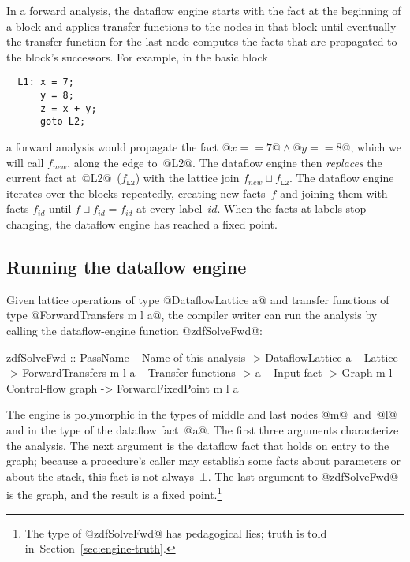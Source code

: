 \documentclass[blockstyle,preprint,natbib,nocopyrightspace]{sigplanconf}
\newcommand\join{\sqcup}
\newcommand{\authornote}[1]{{\em #1}}
\def\authornote#1{\unskip\relax}
\newcommand{\norman}[1]{\authornote{NR: #1}}
\let\remark\norman
\newcommand\secref[1]{Section~\ref{sec:#1}}
\newcommand\seclabel[1]{\label{sec:#1}}
\begin{document}
In a forward analysis, the dataflow engine starts with the fact at the
beginning of a block and applies transfer functions to the nodes in
that block until eventually the transfer function for the last node
computes the facts that are propagated to the block's successors.
For example, in the basic block
\begin{verbatim}
  L1: x = 7;
      y = 8;
      z = x + y;
      goto L2;
\end{verbatim}
a forward analysis would propagate the fact 
$@x == 7@ \land @y == 8@$, which we will call $f_{\mathit{new}}$,
along the edge to~@L2@. 
The dataflow engine then \emph{replaces} the current fact
at~@L2@~($f_{\mathtt{L2}}$) with the lattice join $f_{\mathit{new}}
\join f_{\mathtt{L2}}$. 
The dataflow engine iterates over the blocks repeatedly, creating new
facts~$f$ and joining them with facts $f_{\mathit{id}}$ until
\mbox{$f \join f_{\mathit{id}} = f_{\mathit{id}}$} at every label~$\mathit{id}$.
When the facts at labels stop changing, the dataflow
engine has reached a fixed point.



\subsection{Running the dataflow engine}

\seclabel{zdfSolveFwd}

Given lattice operations of type @DataflowLattice a@
and transfer functions of type @ForwardTransfers m l a@,
the compiler writer can run the analysis by calling the
dataflow-engine function @zdfSolveFwd@:
\begin{code}
 zdfSolveFwd 
  :: PassName               -- Name of this analysis
  -> DataflowLattice a      -- Lattice
  -> ForwardTransfers m l a -- Transfer functions
  -> a                      -- Input fact
  -> Graph m l              -- Control-flow graph
  -> ForwardFixedPoint m l a
\end{code}
The engine is polymorphic in the types of middle and last nodes
@m@~and~@l@ and in the type of the dataflow fact~@a@.
The first three arguments characterize the analysis.
The next argument is the dataflow fact that holds on entry to the
graph;
because a procedure's caller may establish some facts about
parameters or about the stack,
this fact
is not always~$\bot$.
The last argument to @zdfSolveFwd@ is the graph, and the result is a 
fixed point.\footnote
{The type of @zdfSolveFwd@ has pedagogical lies;
truth is told in~\secref{engine-truth}.}
\end{document}
